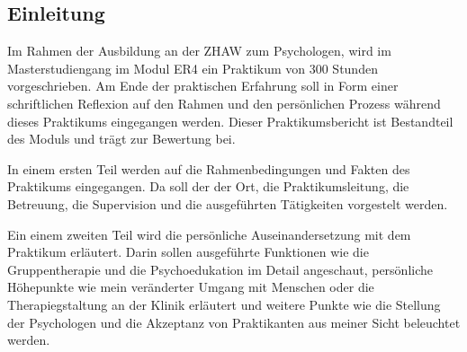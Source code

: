 \subsection{Einleitung} \label{sec:Einleitung}
Im Rahmen der Ausbildung an der ZHAW zum Psychologen, wird im Masterstudiengang im Modul ER4  ein Praktikum von 300 Stunden vorgeschrieben. Am Ende der praktischen Erfahrung soll in Form einer schriftlichen Reflexion auf den Rahmen und den persönlichen Prozess während dieses Praktikums eingegangen werden. Dieser Praktikumsbericht ist Bestandteil des Moduls und trägt zur Bewertung bei. 

In einem ersten Teil werden auf die Rahmenbedingungen und Fakten des Praktikums eingegangen. Da soll der der Ort, die Praktikumsleitung, die Betreuung, die Supervision und die ausgeführten Tätigkeiten vorgestelt werden.

Ein einem zweiten Teil wird die persönliche Auseinandersetzung mit dem Praktikum erläutert. Darin sollen ausgeführte Funktionen wie die Gruppentherapie und die Psychoedukation im Detail angeschaut, persönliche Höhepunkte wie mein veränderter Umgang mit Menschen oder die Therapiegstaltung an der Klinik erläutert und weitere Punkte wie die Stellung der Psychologen und die Akzeptanz von Praktikanten aus meiner Sicht beleuchtet werden.





